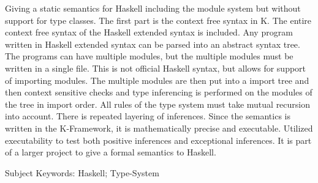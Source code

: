 Giving a static semantics for Haskell including the module system but without support for type classes. The first part is the context free syntax in K. The entire context free syntax of the Haskell extended syntax is included. Any program written in Haskell extended syntax can be parsed into an abstract syntax tree. The programs can have multiple modules, but the multiple modules must be written in a single file. This is not official Haskell syntax, but allows for support of importing modules. The multiple modules are then put into a import tree and then context sensitive checks and type inferencing is performed on the modules of the tree in import order. All rules of the type system must take mutual recursion into account. There is repeated layering of inferences. Since the semantics is written in the K-Framework, it is mathematically precise and executable. Utilized executability to test both positive inferences and exceptional inferences. It is part of a larger project to give a formal semantics to Haskell.

Subject Keywords: Haskell; Type-System